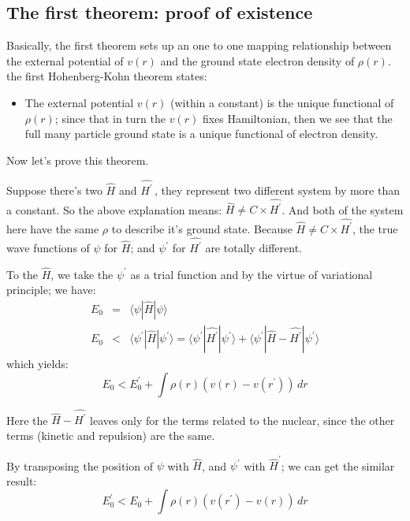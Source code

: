 \subsection{The first theorem: proof of existence}
%
%
Basically, the first theorem sets up an one to one mapping
relationship between the external potential of $v(r)$ and the ground
state electron density of $\rho(r)$. the first Hohenberg-Kohn theorem
states:
\begin{itemize}
\item The external potential $v(r)$ (within a constant) is the unique
  functional of $\rho(r)$; since that in turn the $v(r)$ fixes
  Hamiltonian, then we see that the full many particle ground state is
  a unique functional of electron density.
\end{itemize}

Now let's prove this theorem.

Suppose there's two $\hat{H}$ and $\hat{H^{'}}$\,, they represent two
different system by more than a constant. So the above explanation
means: $\hat{H}\neq C\times\hat{H^{'}}$. And both of the system here
have the same $\rho$ to describe it's ground state.  Because
$\hat{H}\neq C\times\hat{H^{'}}$, the true wave functions of $\psi$
for $\hat{H}$; and $\psi^{'}$ for $\hat{H^{'}}$ are totally different.


To the $\hat{H}$, we take the $\psi^{'}$ as a trial function and by
the virtue of variational principle; we have:
\begin{eqnarray}\label{DFTIeq:6}
  E_{0} &=& \langle\psi|\hat{H}|\psi\rangle   \nonumber  \\
  E_{0} &<& \langle\psi^{'}|\hat{H}|\psi^{'}\rangle =
  \langle\psi^{'}|\hat{H^{'}}|\psi^{'}\rangle +
  \langle\psi^{'}|\hat{H}-\hat{H^{'}}|\psi^{'}\rangle
\end{eqnarray}
which yields:
\begin{equation}\label{DFTIeq:3}
  E_{0} < E_{0}^{'} + \int\rho(r)(v(r)-v(r^{'}))\,dr
\end{equation}

Here the $\hat{H}-\hat{H^{'}}$ leaves only for the terms related to
the nuclear, since the other terms (kinetic and repulsion) are the
same.

By transposing the position of $\psi$ with $\hat{H}$, and $\psi^{'}$
with $\hat{H}^{'}$; we can get the similar result:
\begin{equation}\label{DFTIeq:4}
  E_{0}^{'} < E_{0} + \int\rho(r)(v(r^{'})-v(r))\,dr
\end{equation}

